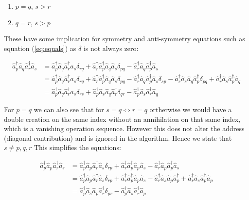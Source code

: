 \documentclass[12p]{article}
\begin{document}
\begin{enumerate}
  \item $p = q$, $s > r$
  \item $q = r$, $s > p$
\end{enumerate}

These have some implication for symmetry and anti-symmetry equations such as equation (\ref{eq:equals}) as $\delta$ is not always zero:


\begin{align}
  \hat{a}^\dagger_p \hat{a}_q \hat{a}^\dagger_r \hat{a}_s & = \hat{a}^\dagger_p \hat{a}_q \hat{a}^\dagger_r \hat{a}_s \delta_{rq} + \hat{a}^\dagger_r \hat{a}^\dagger_p \hat{a}_q \hat{a}_s \delta_{pq} - \hat{a}^\dagger_r \hat{a}_q \hat{a}^\dagger_p \hat{a}_s \\
  & = \hat{a}^\dagger_p \hat{a}_q \hat{a}^\dagger_r \hat{a}_s \delta_{rq} + \hat{a}^\dagger_r \hat{a}^\dagger_p \hat{a}_q \hat{a}_s \delta_{pq} - \hat{a}^\dagger_r \hat{a}_q \hat{a}^\dagger_p \hat{a}_s \delta_{sp} - \hat{a}^\dagger_r \hat{a}_s \hat{a}_q \hat{a}^\dagger_p \delta_{pq} + \hat{a}^\dagger_r \hat{a}_s \hat{a}^\dagger_p \hat{a}_q \\
  & = \hat{a}^\dagger_p \hat{a}_q \hat{a}^\dagger_r \hat{a}_s \delta_{rs} + \hat{a}^\dagger_p \hat{a}_s \hat{a}_q \hat{a}^\dagger_r \delta_{qr} - \hat{a}^\dagger_p \hat{a}_s \hat{a}^\dagger_r \hat{a}_q
\end{align}

For $p = q$ we can also see that for $s = q \iff r = q$ ortherwise we would have a double creation on the same index without an annihilation on that same index, which is a vanishing operation sequence. However this does not alter the address (diagonal contribution) and is ignored in the algorithm. Hence we state that $ s \neq p, q, r $ This simplifies the equations:

\begin{align}
  \hat{a}^\dagger_p \hat{a}_p \hat{a}^\dagger_r \hat{a}_s & = \hat{a}^\dagger_p \hat{a}_p \hat{a}^\dagger_r \hat{a}_s \delta_{rp} + \hat{a}^\dagger_r \hat{a}^\dagger_p \hat{a}_p \hat{a}_s - \hat{a}^\dagger_r \hat{a}_p \hat{a}^\dagger_p \hat{a}_s \\
  & = \hat{a}^\dagger_p \hat{a}_p \hat{a}^\dagger_r \hat{a}_s \delta_{rp} + \hat{a}^\dagger_r \hat{a}^\dagger_p \hat{a}_p \hat{a}_s - \hat{a}^\dagger_r \hat{a}_s \hat{a}_p \hat{a}^\dagger_p  + \hat{a}^\dagger_r \hat{a}_s \hat{a}^\dagger_p \hat{a}_p \\
  & = \hat{a}^\dagger_p \hat{a}_s \hat{a}_p \hat{a}^\dagger_r \delta_{pr} - \hat{a}^\dagger_p \hat{a}_s \hat{a}^\dagger_r \hat{a}_p
\end{align}
\end{document}
